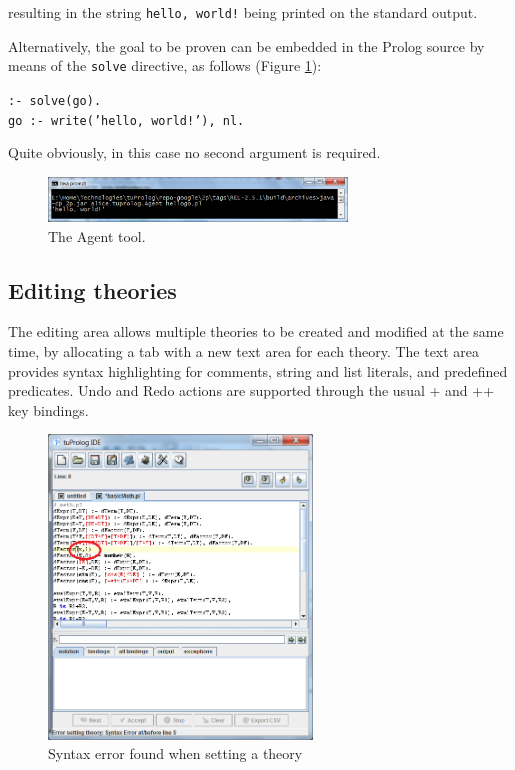 \noindent resulting in the string \texttt{hello, world!} being printed on the standard output.

\noindent Alternatively, the goal to be proven can be embedded in the Prolog source by means of the \texttt{solve} directive, as follows (Figure \ref{fig:tuprologAgent}):

\texttt{:- solve(go).}\\
\indent\texttt{go :- write('hello, world!'), nl.}

\noindent Quite obviously, in this case no second argument is required.

\begin{figure}
  \includegraphics[width=300px]{images/tuprologAgent.png}
  \caption{The \tuprolog{} Agent tool.}\label{fig:tuprologAgent}
\end{figure}

\subsection{Editing theories}
\label{sec:editing-theories}

The editing area allows multiple theories to be created and modified at the same time, by allocating a tab with a new text area for each theory.
%
The text area provides syntax highlighting for comments, string and list literals, and predefined predicates.
%
Undo and Redo actions are supported through the usual + and ++ key bindings.

\begin{figure}
\centering
\includegraphics[width=7cm]{images/syntaxErrorFound}
\caption{Syntax error found when setting a theory}
\label{fig:syntax-error-found}
\end{figure}

